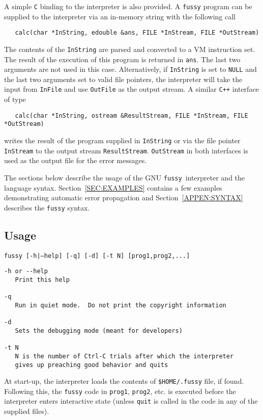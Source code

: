 \documentclass[11pt]{article}
\newcommand{\Fussy}{GNU {\tt fussy}}
\begin{document}
A simple {\tt C} binding to the interpreter is also provided.  A {\tt fussy} program can be
supplied to the interpreter via an in-memory string with the following call
\begin{verbatim}
   calc(char *InString, edouble &ans, FILE *InStream, FILE *OutStream)  
\end{verbatim}

The contents of the {\tt InString} are parsed and converted to a VM
instruction set.  The result of the execution of this program is returned in {\tt ans}.
The last two arguments are not used in this case.  Alternatively, if {\tt InString} is
set to {\tt NULL} and the last two arguments set to valid file pointers, the interpreter
will take the input from {\tt InFile} and use {\tt OutFile} as the output stream.  A
similar {\tt C++} interface of type
\begin{verbatim}
   calc(char *InString, ostream &ResultStream, FILE *InStream, FILE *OutStream)
\end{verbatim}

writes the result of the program supplied in {\tt InString} or via the file pointer {\tt
  InStream} to the output stream {\tt ResultStream}.  {\tt OutStream} in both interfaces
is used as the output file for the error messages.

The sections below describe the usage of the \Fussy\ interpreter and the language
syntax. Section~\ref{SEC:EXAMPLES} contains a few examples demonstrating automatic error
propagation and Section~\ref{APPEN:SYNTAX} describes the {\tt fussy} syntax.


\subsection{Usage}
{\tt fussy [-h|--help] [-q] [-d] [-t N] [prog1,prog2,...]}

\begin{verbatim}
-h or --help
   Print this help

-q
   Run in quiet mode.  Do not print the copyright information

-d
   Sets the debugging mode (meant for developers)

-t N
   N is the number of Ctrl-C trials after which the interpreter
   gives up preaching good behavior and quits
\end{verbatim}

At start-up, the interpreter loads the contents of {\tt \$HOME/.fussy} file, if found.
Following this, the {\tt fussy} code in {\tt prog1}, {\tt prog2}, etc. is executed before the interpreter
enters interactive state (unless {\tt quit} is called in the code in any of the supplied
files).
\end{document}
